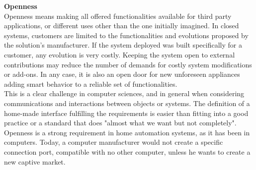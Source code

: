 {\bf Openness}\\
Openness means making all offered functionalities available for third party applications, or different uses other than the one initially imagined. 
In closed systems, customers are limited to the functionalities and evolutions proposed by the solution's manufacturer. If the system deployed was built specifically for a customer, any evolution is very costly. Keeping the system open to external contributions may reduce the number of demands for costly system modifications or add-ons. In any case, it is also an open door for new unforeseen appliances adding smart behavior to a reliable set of functionalities.\\
This is a clear challenge in computer sciences, and in general when considering communications and interactions between objects or systems. 
The definition of a home-made interface fulfilling the requirements is easier than fitting into a good practice or a standard that does "almost what we want but not completely".\\
Openness is a strong requirement in home automation systems, as it has been in computers. Today, a computer manufacturer would not create a specific connection port, compatible with no other computer, unless he wants to create a new captive market.\\

